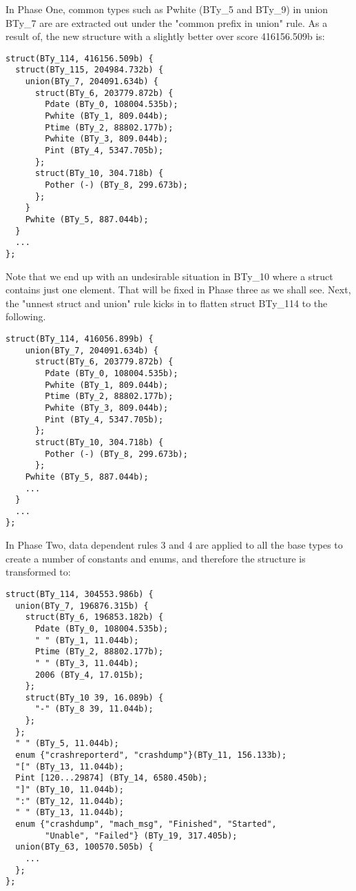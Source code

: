 In Phase One, common types such as Pwhite (BTy\_5 and BTy\_9) in union BTy\_7 are
are extracted out under the "common prefix in union" rule.
As a result of, the new structure with a slightly better over score 416156.509b is:

{\small
\begin{verbatim}
struct(BTy_114, 416156.509b) {
  struct(BTy_115, 204984.732b) {
    union(BTy_7, 204091.634b) {
      struct(BTy_6, 203779.872b) {
        Pdate (BTy_0, 108004.535b);
        Pwhite (BTy_1, 809.044b);
        Ptime (BTy_2, 88802.177b);
        Pwhite (BTy_3, 809.044b);
        Pint (BTy_4, 5347.705b);
      };
      struct(BTy_10, 304.718b) {
        Pother (-) (BTy_8, 299.673b);
      };
    }
    Pwhite (BTy_5, 887.044b);
  }
  ...
};
\end{verbatim}
}

Note that we end up with an undesirable situation in BTy\_10 where a struct 
contains just one element. That will be fixed in Phase three as we shall see.
Next, the "unnest struct and union" rule kicks in to flatten struct BTy\_114 to
the following.

{\small
\begin{verbatim}
struct(BTy_114, 416056.899b) {
    union(BTy_7, 204091.634b) {
      struct(BTy_6, 203779.872b) {
        Pdate (BTy_0, 108004.535b);
        Pwhite (BTy_1, 809.044b);
        Ptime (BTy_2, 88802.177b);
        Pwhite (BTy_3, 809.044b);
        Pint (BTy_4, 5347.705b);
      };
      struct(BTy_10, 304.718b) {
        Pother (-) (BTy_8, 299.673b);
      };
    Pwhite (BTy_5, 887.044b);
    ...
  }
  ...
};
\end{verbatim}
}

In Phase Two, data dependent rules 3 and 4 are applied to all the base types to 
create a number of constants and enums, and therefore the structure is
transformed to: 
{\small
\begin{verbatim}
struct(BTy_114, 304553.986b) {
  union(BTy_7, 196876.315b) {
    struct(BTy_6, 196853.182b) {
      Pdate (BTy_0, 108004.535b);
      " " (BTy_1, 11.044b);
      Ptime (BTy_2, 88802.177b);
      " " (BTy_3, 11.044b);
      2006 (BTy_4, 17.015b);
    };
    struct(BTy_10 39, 16.089b) {
      "-" (BTy_8 39, 11.044b);
    };
  };
  " " (BTy_5, 11.044b);
  enum {"crashreporterd", "crashdump"}(BTy_11, 156.133b);
  "[" (BTy_13, 11.044b);
  Pint [120...29874] (BTy_14, 6580.450b);
  "]" (BTy_10, 11.044b);
  ":" (BTy_12, 11.044b);
  " " (BTy_13, 11.044b);
  enum {"crashdump", "mach_msg", "Finished", "Started", 
        "Unable", "Failed"} (BTy_19, 317.405b);
  union(BTy_63, 100570.505b) {
    ...
  };
};
\end{verbatim}
}

